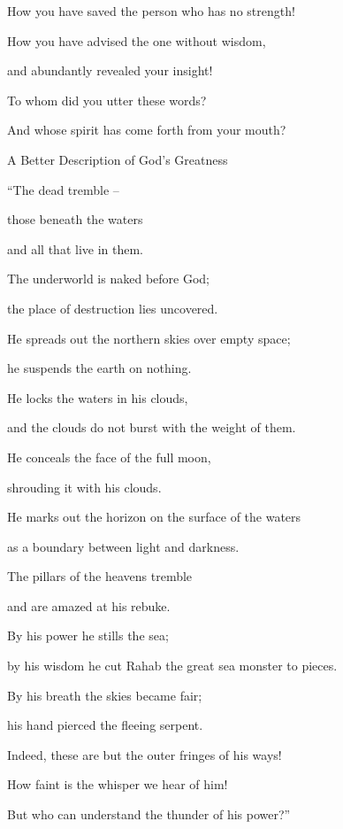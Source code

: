 {\par }{\Q How you have
saved
the person
who has
no
strength!
\par }{\Q {}How
you have advised
the one without
wisdom,
\par }{\Q and abundantly
revealed
your insight!
\par }{\Q {}To whom
did you utter
these words?
\par }{\Q And whose
spirit has
come forth
from your mouth?
\par }{\SH A Better Description of God’s Greatness
\par }{\Q {}“The dead
tremble –
\par }{\Q those beneath
the waters
\par }{\Q and all that live in them.
\par }{\Q {}The underworld
is naked
before
God;

\par }{\Q the place of destruction
lies uncovered.
\par }{\Q {}He spreads out
the northern
skies over
empty
space;

\par }{\Q he suspends the earth
on
nothing.
\par }{\Q {}He locks
the waters
in his clouds,
\par }{\Q and the clouds
do not
burst
with the weight of them.
\par }{\Q {}He conceals
the face
of the full moon,
\par }{\Q shrouding
it with
his clouds.
\par }{\Q {}He marks out
the horizon
on
the surface
of the waters
\par }{\Q as
a boundary
between
light
and darkness.
\par }{\Q {}The pillars
of the heavens
tremble
\par }{\Q and are amazed
at his rebuke.
\par }{\Q {}By his power
he stills
the sea;
\par }{\Q by his wisdom
he cut
Rahab the great sea monster to pieces.
\par }{\Q {}By his breath
the skies
became fair;
\par }{\Q his hand
pierced
the fleeing
serpent.
\par }{\Q {}Indeed,
these
are but the outer fringes
of his ways!

\par }{\Q How
faint is the whisper
we hear
of him!
\par }{\Q But who can
understand
the thunder
of his power?”


}
